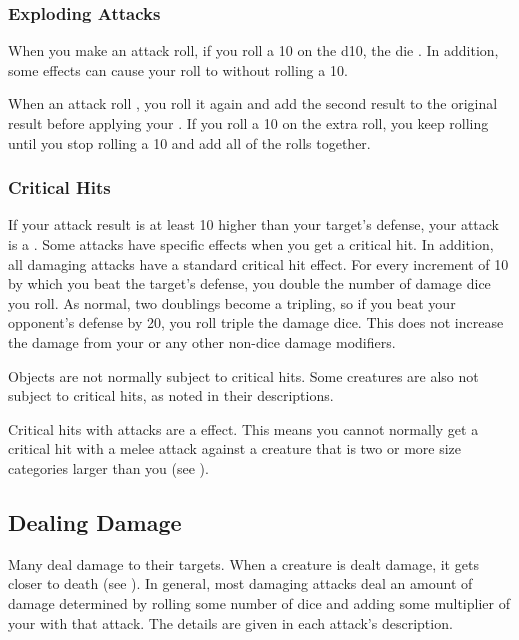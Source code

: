         \subsubsection{Exploding Attacks}\label{Exploding Attacks}
            When you make an attack roll, if you roll a 10 on the d10, the die .
            In addition, some effects can cause your roll to  without rolling a 10.

            When an attack roll , you roll it again and add the second result to the original result before applying your .
            If you roll a 10 on the extra roll, you keep rolling until you stop rolling a 10 and add all of the rolls together.

        \subsubsection{Critical Hits}\label{Critical Hits}
            If your attack result is at least 10 higher than your target's defense, your attack is a .
            Some attacks have specific effects when you get a critical hit.
            In addition, all damaging attacks have a standard critical hit effect.
            For every increment of 10 by which you beat the target's defense, you double the number of damage dice you roll.
            As normal, two doublings become a tripling, so if you beat your opponent's defense by 20, you roll triple the damage dice.
            This does not increase the damage from your  or any other non-dice damage modifiers.

            Objects are not normally subject to critical hits.
            Some creatures are also not subject to critical hits, as noted in their descriptions.

            Critical hits with  attacks are a  effect.
            This means you cannot normally get a critical hit with a melee attack against a creature that is two or more size categories larger than you (see ).

    \subsection{Dealing Damage}\label{Dealing Damage}
        Many  deal damage to their targets.
        When a creature is dealt damage, it gets closer to death (see ).
        In general, most damaging attacks deal an amount of damage determined by rolling some number of dice and adding some multiplier of your  with that attack.
        The details are given in each attack's description.

